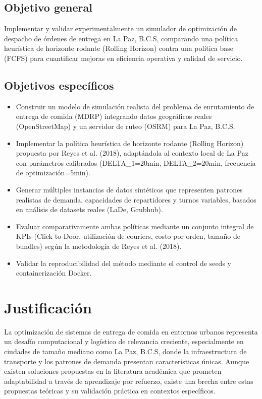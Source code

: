 \section{Objetivo general}

Implementar y validar experimentalmente un simulador de optimización de 
despacho de órdenes de entrega en La Paz, B.C.S, comparando una política 
heurística de horizonte rodante (Rolling Horizon) contra una política 
base (FCFS) para cuantificar mejoras en eficiencia operativa y calidad 
de servicio.

\section{Objetivos específicos}

\begin{itemize}
    \item Construir un modelo de simulación realista del problema de 
    enrutamiento de entrega de comida (MDRP) integrando datos geográficos 
    reales (OpenStreetMap) y un servidor de ruteo (OSRM) para La Paz, B.C.S.
    
    \item Implementar la política heurística de horizonte rodante (Rolling 
    Horizon) propuesta por Reyes et al. (2018), adaptándola al contexto 
    local de La Paz con parámetros calibrados (DELTA_1=20min, DELTA_2=20min, 
    frecuencia de optimización=5min).
    
    \item Generar múltiples instancias de datos sintéticos que representen 
    patrones realistas de demanda, capacidades de repartidores y turnos 
    variables, basados en análisis de datasets reales (LaDe, Grubhub).
    
    \item Evaluar comparativamente ambas políticas mediante un conjunto 
    integral de KPIs (Click-to-Door, utilización de couriers, costo por 
    orden, tamaño de bundles) según la metodología de Reyes et al. (2018).
    
    \item Validar la reproducibilidad del método mediante el control de 
    seeds y containerización Docker.
\end{itemize}

\chapter{Justificación}

La optimización de sistemas de entrega de comida en entornos urbanos 
representa un desafío computacional y logístico de relevancia creciente, 
especialmente en ciudades de tamaño mediano como La Paz, B.C.S, donde 
la infraestructura de transporte y los patrones de demanda presentan 
características únicas. Aunque existen soluciones propuestas en la literatura 
académica que prometen adaptabilidad a través de aprendizaje por refuerzo, 
existe una brecha entre estas propuestas teóricas y su validación práctica 
en contextos específicos.

